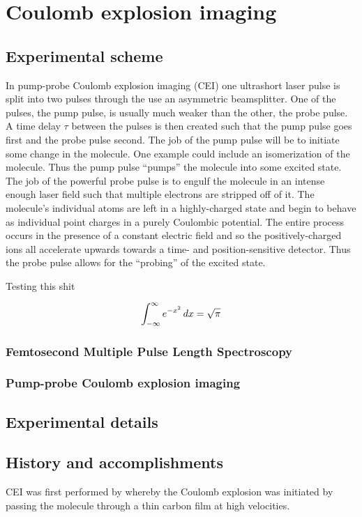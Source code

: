 \chapter{Coulomb explosion imaging}\label{ch:CEI}

\section{Experimental scheme}
In pump-probe Coulomb explosion imaging (CEI) one ultrashort laser pulse is split into two pulses through the use an asymmetric beamsplitter. One of the pulses, the pump pulse, is usually much weaker than the other, the probe pulse. A time delay $\tau$ between the pulses is then created such that the pump pulse goes first and the probe pulse second. The job of the pump pulse will be to initiate some change in the molecule. One example could include an isomerization of the molecule. Thus the pump pulse ``pumps'' the molecule into some excited state. The job of the powerful probe pulse is to engulf the molecule in an intense enough laser field such that multiple electrons are stripped off of it. The molecule's individual atoms are left in a highly-charged state and begin to behave as individual point charges in a purely Coulombic potential. The entire process occurs in the presence of a constant electric field and so the positively-charged ions all accelerate upwards towards a time- and position-sensitive detector. Thus the probe pulse allows for the ``probing'' of the excited state.

Testing this shit

\begin{equation}
\int_{-\infty}^{\infty}e^{-x^2}\,dx=\sqrt{\pi} $$
\end{equation}

\subsection{Femtosecond Multiple Pulse Length Spectroscopy}
\subsection{Pump-probe Coulomb explosion imaging}

\section{Experimental details}

\section{History and accomplishments}
CEI was first performed by \citet{Vager89} whereby the Coulomb explosion was initiated by passing the molecule through a thin carbon film at high velocities.

